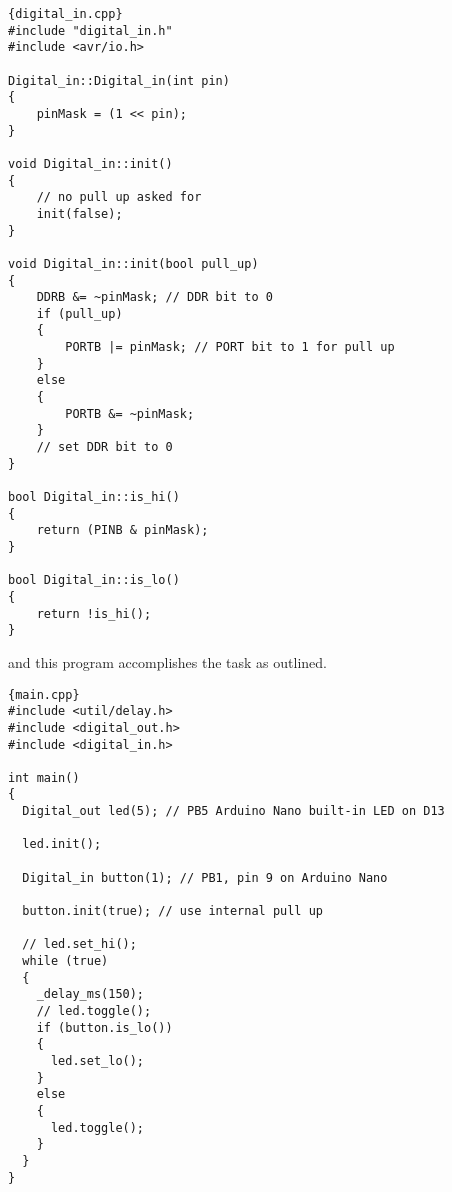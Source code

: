 \documentclass{article}
\begin{document}
\begin{lstlisting}{digital_in.cpp}
#include "digital_in.h"
#include <avr/io.h>

Digital_in::Digital_in(int pin)
{
    pinMask = (1 << pin);
}

void Digital_in::init()
{
    // no pull up asked for
    init(false);
}

void Digital_in::init(bool pull_up)
{
    DDRB &= ~pinMask; // DDR bit to 0
    if (pull_up)
    {
        PORTB |= pinMask; // PORT bit to 1 for pull up
    }
    else
    {
        PORTB &= ~pinMask;
    }
    // set DDR bit to 0
}

bool Digital_in::is_hi()
{
    return (PINB & pinMask);
}

bool Digital_in::is_lo()
{
    return !is_hi();
}

\end{lstlisting}
\newpage
and this program accomplishes the task as outlined.
\begin{lstlisting}{main.cpp}
#include <util/delay.h>
#include <digital_out.h>
#include <digital_in.h>

int main()
{
  Digital_out led(5); // PB5 Arduino Nano built-in LED on D13

  led.init();

  Digital_in button(1); // PB1, pin 9 on Arduino Nano

  button.init(true); // use internal pull up

  // led.set_hi();
  while (true)
  {
    _delay_ms(150);
    // led.toggle();
    if (button.is_lo())
    {
      led.set_lo();
    }
    else
    {
      led.toggle();
    }
  }
}

\end{lstlisting}
\end{document}
